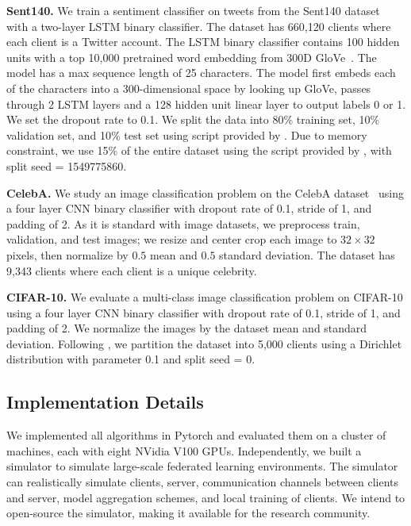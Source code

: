 \documentclass[twoside]{article}
\begin{document}
\textbf{Sent140.} We train a sentiment classifier on tweets from the Sent140 dataset~\citep{leaf, sent140} with a two-layer LSTM binary classifier. The dataset has 660,120 clients where each client is a Twitter account. The LSTM binary classifier contains 100 hidden units with a top 10,000 pretrained word embedding from 300D GloVe~\citep{glove}. The model has a max sequence length of 25 characters. The model first embeds each of the characters into a 300-dimensional space by looking up GloVe, passes through 2 LSTM layers and a 128 hidden unit linear layer to output labels 0 or 1. We set the dropout rate to 0.1. We split the data into 80\% training set, 10\% validation set, and 10\% test set using script provided by \cite{leaf}. Due to memory constraint, we use 15\% of the entire dataset using the script provided by \cite{leaf}, with split seed = 1549775860.

\textbf{CelebA.} We study an image classification problem on the CelebA dataset~\citep{celeba, leaf} using a four layer CNN binary classifier with dropout rate of 0.1, stride of 1, and padding of 2. As it is standard with image datasets, we preprocess train, validation, and test images; we resize and center crop each image to $32 \times 32$ pixels, then normalize by $0.5$ mean and $0.5$ standard deviation. The dataset has 9,343 clients where each client is a unique celebrity. 

\textbf{CIFAR-10.} We evaluate a multi-class image classification problem on CIFAR-10 \citep{cifar10} using a four layer CNN binary classifier with dropout rate of 0.1, stride of 1, and padding of 2. We normalize the images by the dataset mean and standard deviation. Following \citet{fedavgm}, we partition the dataset into 5,000 clients using a Dirichlet distribution with parameter 0.1 and split seed = 0. 



\subsection{Implementation Details}
\label{sec:appendix_imple}
We implemented all algorithms in Pytorch \citep{pytorch} and evaluated them on a cluster of machines, each with eight NVidia V100 GPUs. Independently, we built a simulator to simulate large-scale federated learning environments. The simulator can realistically simulate clients, server, communication channels between clients and server, model aggregation schemes, and local training of clients. We intend to open-source the simulator, making it available for the research community.
\end{document}
